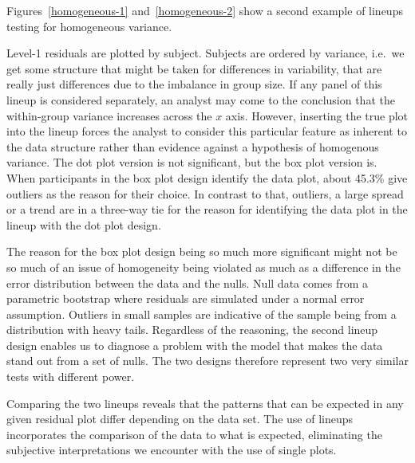 \documentclass[12pt]{article} %
\newcommand{\alnote}[1]{\todo[inline,color=green!40]{#1}} %
\begin{document}
Figures~\ref{homogeneous-1} and~\ref{homogeneous-2} show a second example of lineups testing for homogeneous variance.

Level-1 residuals are plotted by subject. Subjects are ordered by variance, i.e.~we get some structure that might be taken for differences in variability, that are really just differences due to the imbalance in group size. If any panel of this lineup is considered separately, an analyst may come to the conclusion that the within-group variance increases across the $x$ axis.  However, inserting the true plot into the lineup forces the analyst to consider this particular feature as inherent to the data structure rather than evidence against a hypothesis of homogenous variance. 
The dot plot version is not significant, but the box plot version is. When participants in the box plot design identify the data plot, about 45.3\% give outliers as the reason for their choice. In contrast to that, outliers, a large spread or a trend are in a three-way tie for the reason for identifying the data plot in the lineup with the dot plot design.

The reason for the box plot design being so much more significant might not be so much of an issue of homogeneity being violated as much as a difference in the error distribution between the data and the nulls. Null data comes from a parametric bootstrap where residuals are simulated under a normal error assumption. Outliers in small samples are indicative of the sample being from a distribution with heavy tails.
Regardless of the reasoning, the second lineup design enables us to diagnose a problem with the model that makes the data stand out from a set of nulls.  The two designs therefore represent two very similar tests with different power.




Comparing the two lineups reveals that the patterns that can be expected in any given residual plot differ depending on the data set. The use of lineups incorporates the comparison of the data to what is expected, eliminating the subjective interpretations we encounter with the use of single plots. 
\end{document}
